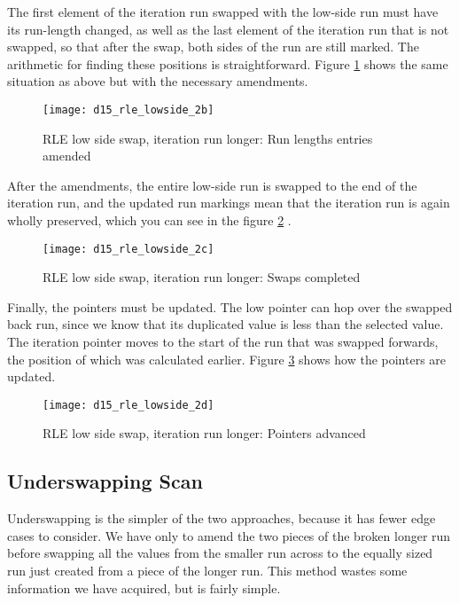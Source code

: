 The first element of the iteration run swapped with the low-side run must have its run-length changed, as well as the last element of the iteration run that is not swapped, so that after the swap, both sides of the run are still marked. The arithmetic for finding these positions is straightforward. Figure \ref{fig:rle_lowside_2b} shows the same situation as above but with the necessary amendments.

\begin{figure}[H]
  \centering
  \texttt{[image: d15\_rle\_lowside\_2b]}
  \caption{RLE low side swap, iteration run longer: Run lengths entries amended}
  \label{fig:rle_lowside_2b}
\end{figure}

After the amendments, the entire low-side run is swapped to the end of the iteration run, and the updated run markings mean that the iteration run is again wholly preserved, which you can see in the figure \ref{fig:rle_lowside_2c} .

\begin{figure}[H]
  \centering
  \texttt{[image: d15\_rle\_lowside\_2c]}
  \caption{RLE low side swap, iteration run longer: Swaps completed}
  \label{fig:rle_lowside_2c}
\end{figure}

Finally, the pointers must be updated. The low pointer can hop over the swapped back run, since we know that its duplicated value is less than the selected value. The iteration pointer moves to the start of the run that was swapped forwards, the position of which was calculated earlier. Figure \ref{fig:rle_lowside_2d} shows how the pointers are updated.

\begin{figure}[H]
  \centering
  \texttt{[image: d15\_rle\_lowside\_2d]}
  \caption{RLE low side swap, iteration run longer: Pointers advanced}
  \label{fig:rle_lowside_2d}
\end{figure}

\subsection{Underswapping Scan}

Underswapping is the simpler of the two approaches, because it has fewer edge cases to consider. We have only to amend the two pieces of the broken longer run before swapping all the values from the smaller run across to the equally sized run just created from a piece of the longer run. This method wastes some information we have acquired, but is fairly simple.

